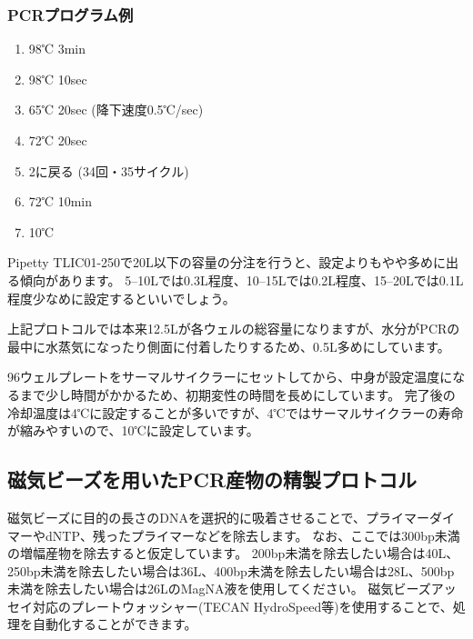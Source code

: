 \documentclass[titlepage,10pt,a4paper]{jsbook}
\begin{document}
\subsubsection{PCRプログラム例}
\begin{enumerate}
\item 98℃ 3min
\item 98℃ 10sec
\item 65℃ 20sec (降下速度0.5℃/sec)
\item 72℃ 20sec
\item 2に戻る (34回・35サイクル)
\item 72℃ 10min
\item 10℃
\end{enumerate}

Pipetty TLIC01-250で20{\textmu}L以下の容量の分注を行うと、設定よりもやや多めに出る傾向があります。
5--10{\textmu}Lでは0.3{\textmu}L程度、10--15{\textmu}Lでは0.2{\textmu}L程度、15--20{\textmu}Lでは0.1{\textmu}L程度少なめに設定するといいでしょう。

上記プロトコルでは本来12.5{\textmu}Lが各ウェルの総容量になりますが、水分がPCRの最中に水蒸気になったり側面に付着したりするため、0.5{\textmu}L多めにしています。

96ウェルプレートをサーマルサイクラーにセットしてから、中身が設定温度になるまで少し時間がかかるため、初期変性の時間を長めにしています。
完了後の冷却温度は4℃に設定することが多いですが、4℃ではサーマルサイクラーの寿命が縮みやすいので、10℃に設定しています。

\subsection{磁気ビーズを用いたPCR産物の精製プロトコル}

磁気ビーズに目的の長さのDNAを選択的に吸着させることで、プライマーダイマーやdNTP、残ったプライマーなどを除去します。
なお、ここでは300bp未満の増幅産物を除去すると仮定しています。
200bp未満を除去したい場合は40{\textmu}L、250bp未満を除去したい場合は36{\textmu}L、400bp未満を除去したい場合は28{\textmu}L、500bp未満を除去したい場合は26{\textmu}LのMagNA液を使用してください。
磁気ビーズアッセイ対応のプレートウォッシャー(TECAN HydroSpeed等)を使用することで、処理を自動化することができます。
\end{document}

